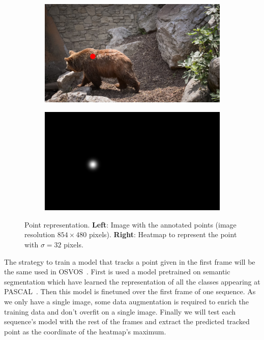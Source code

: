 \begin{figure}[h]
  \centering
  \begin{subfigure}{.5\textwidth}
    \centering
    \includegraphics[width=.8\linewidth]{figures/methods/heatmaps/image_point.png}
  \end{subfigure}%
  \begin{subfigure}{.5\textwidth}
    \centering
    \includegraphics[width=.8\linewidth]{figures/methods/heatmaps/heatmap.png}
  \end{subfigure}
  \caption{
  Point representation.
  \textbf{Left}: Image with the annotated points (image resolution $854 \times 480$ pixels).
  \textbf{Right}: Heatmap to represent the point with $\sigma = 32$ pixels. }
  \label{fig:tracking:pointrepresentation}
\end{figure}

The strategy to train a model that tracks a point given in the first frame will be the same used in OSVOS~\osvos{}.
First is used a model pretrained on semantic segmentation which have learned the representation of all the classes appearing at PASCAL~\pascal{}.
Then this model is finetuned over the first frame of one sequence.
As we only have a single image, some data augmentation is required to enrich the training data and don't overfit on a single image.
Finally we will test each sequence's model with the rest of the frames and extract the predicted tracked point as the coordinate of the heatmap's maximum.

